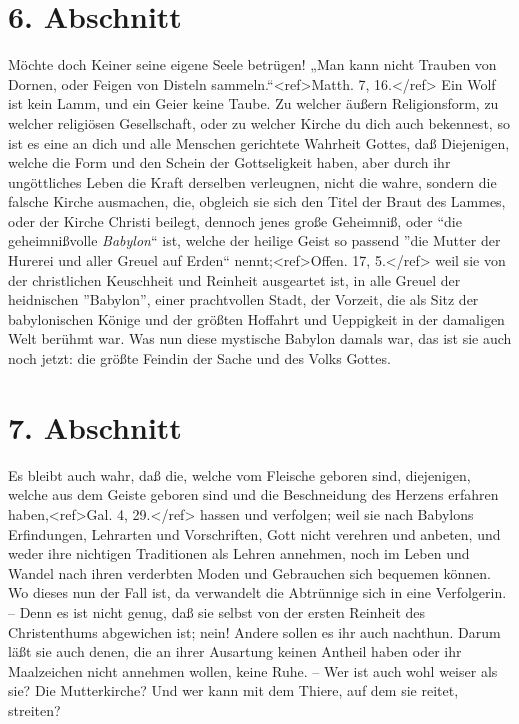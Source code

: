 \section{6. Abschnitt}

Möchte doch Keiner seine eigene Seele betrügen! „Man kann nicht Trauben von Dornen, oder Feigen von Disteln sammeln.“<ref>Matth. 7, 16.</ref> Ein Wolf ist kein Lamm, und ein Geier keine Taube. Zu welcher äußern Religionsform, zu welcher religiösen Gesellschaft, oder zu welcher Kirche du dich auch bekennest, so ist es eine an dich und alle Menschen gerichtete Wahrheit Gottes, daß Diejenigen, welche die Form und den Schein der Gottseligkeit haben, aber durch ihr ungöttliches Leben die Kraft derselben verleugnen, nicht die wahre, sondern die falsche Kirche ausmachen, die, obgleich sie sich den Titel der Braut des Lammes, oder der Kirche Christi beilegt, dennoch jenes große Geheimniß, oder ``die geheimnißvolle \textit{Babylon}`` ist, welche der heilige Geist so passend ''die Mutter der Hurerei und aller Greuel auf Erden`` nennt;<ref>Offen. 17, 5.</ref> weil sie von der christlichen Keuschheit und Reinheit ausgeartet ist, in alle Greuel der heidnischen ''Babylon'', einer prachtvollen Stadt, der Vorzeit, die als Sitz der babylonischen Könige und der größten Hoffahrt und Ueppigkeit in der damaligen Welt berühmt war. Was nun diese mystische Babylon damals war, das ist sie auch noch jetzt: die größte Feindin der Sache und des Volks Gottes.

\section{7. Abschnitt}

Es bleibt auch wahr, daß die, welche vom Fleische geboren sind, diejenigen, welche aus dem Geiste geboren sind und die Beschneidung des Herzens erfahren haben,<ref>Gal. 4, 29.</ref> hassen und verfolgen; weil sie nach Babylons Erfindungen, Lehrarten und Vorschriften, Gott nicht verehren und anbeten, und weder ihre nichtigen Traditionen als Lehren annehmen, noch im Leben und Wandel nach ihren verderbten Moden und Gebrauchen sich bequemen können. Wo dieses nun der Fall ist, da verwandelt die Abtrünnige sich in eine Verfolgerin. – Denn es ist nicht genug, daß sie selbst von der ersten Reinheit des Christenthums abgewichen ist; nein! Andere sollen es ihr auch nachthun. Darum läßt sie auch denen, die an ihrer Ausartung keinen Antheil haben oder ihr Maalzeichen nicht annehmen wollen, keine Ruhe. – Wer ist auch wohl weiser als sie? Die Mutterkirche? Und wer kann mit dem Thiere, auf dem sie reitet, streiten? 

